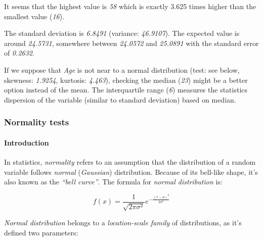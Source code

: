 \documentclass[]{article}
\begin{document}
It seems that the highest value is \emph{58} which is exactly 3.625
times higher than the smallest value (\emph{16}).

The standard deviation is \emph{6.8491} (variance: \emph{46.9107}). The
expected value is around \emph{24.5731}, somewhere between
\emph{24.0572} and \emph{25.0891} with the standard error of
\emph{0.2632}.

If we suppose that \emph{Age} is not near to a normal distribution
(test: see below, skewness: \emph{1.9254}, kurtosis: \emph{4.463}),
checking the median (\emph{23}) might be a better option instead of the
mean. The interquartile range (\emph{6}) measures the statistics
dispersion of the variable (similar to standard deviation) based on
median.

\subsubsection{Normality tests}

\paragraph{Introduction}

In statistics, \emph{normality} refers to an assumption that the
distribution of a random variable follows \emph{normal}
(\emph{Gaussian}) distribution. Because of its bell-like shape, it's
also known as the \emph{``bell curve''}. The formula for \emph{normal
distribution} is:

\[f(x) = \frac{1}{\sqrt{2\pi{}\sigma{}^2}} e^{-\frac{(x-\mu{})^2}{2\sigma{}^2}}\]

\emph{Normal distribution} belongs to a \emph{location-scale family} of
distributions, as it's defined two parameters:
\end{document}
